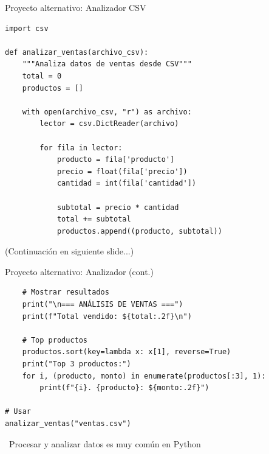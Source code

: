 \documentclass{beamer}
\begin{document}
\begin{frame}[fragile]{Proyecto alternativo: Analizador CSV \faChartBar}
\begin{lstlisting}
import csv

def analizar_ventas(archivo_csv):
    """Analiza datos de ventas desde CSV"""
    total = 0
    productos = []
    
    with open(archivo_csv, "r") as archivo:
        lector = csv.DictReader(archivo)
        
        for fila in lector:
            producto = fila['producto']
            precio = float(fila['precio'])
            cantidad = int(fila['cantidad'])
            
            subtotal = precio * cantidad
            total += subtotal
            productos.append((producto, subtotal))
\end{lstlisting}

\small(Continuación en siguiente slide...)
\end{frame}

\begin{frame}[fragile]{Proyecto alternativo: Analizador (cont.) \faFileAlt}
\begin{lstlisting}
    # Mostrar resultados
    print("\n=== ANÁLISIS DE VENTAS ===")
    print(f"Total vendido: ${total:.2f}\n")
    
    # Top productos
    productos.sort(key=lambda x: x[1], reverse=True)
    print("Top 3 productos:")
    for i, (producto, monto) in enumerate(productos[:3], 1):
        print(f"{i}. {producto}: ${monto:.2f}")

# Usar
analizar_ventas("ventas.csv")
\end{lstlisting}

\vspace{-0.1cm}
\begin{notebox}
\small\faChartLine\ Procesar y analizar datos es muy común en Python
\end{notebox}
\end{frame}
\end{document}
